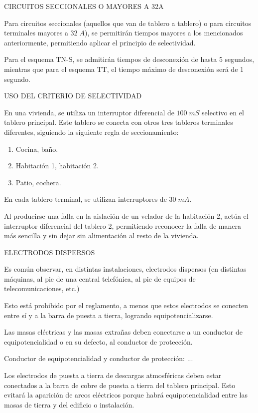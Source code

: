 CIRCUITOS SECCIONALES O MAYORES A 32A

Para circuitos seccionales (aquellos que van de tablero a tablero) o para circuitos terminales mayores a $32\; A$), se permitirán tiempos mayores a los mencionados anteriormente, permitiendo aplicar el principio de selectividad.

Para el esquema TN-S, se admitirán tiempos de desconexión de hasta 5 segundos, mientras que para el esquema TT, el tiempo máximo de desconexión será de 1 segundo.

USO DEL CRITERIO DE SELECTIVIDAD
\begin{ejemplo}
	En una vivienda, se utiliza un interruptor diferencial de $100\; mS$ selectivo en el tablero principal. Este tablero se conecta con otros tres tableros terminales diferentes, siguiendo la siguiente regla de seccionamiento:
	\begin{enumerate}
		\item Cocina, baño.
		\item Habitación 1, habitación 2.
		\item Patio, cochera.
	\end{enumerate}
 	En cada tablero terminal, se utilizan interruptores de $30\; mA$.
 	
 	Al producirse una falla en la aislación de un velador de la habitación 2, actúa el interruptor diferencial del tablero 2, permitiendo reconocer la falla de manera más sencilla y sin dejar sin alimentación al resto de la vivienda.
\end{ejemplo}


ELECTRODOS DISPERSOS

Es común observar, en distintas instalaciones, electrodos dispersos (en distintas máquinas, al pie de una central telefónica, al pie de equipos de telecomunicaciones, etc.)

Esto está prohibido por el reglamento, a menos que estos electrodos se conecten entre sí y a la barra de puesta a tierra, logrando equipotencializarse.

Las masas eléctricas y las masas extrañas deben conectarse a un conductor de equipotencialidad o en su defecto, al conductor de protección.

Conductor de equipotencialidad y conductor de protección: ...

Los electrodos de puesta a tierra de descargas atmosféricas deben estar conectados a la barra de cobre de puesta a tierra del tablero principal. Esto evitará la aparición de arcos eléctricos porque habrá equipotencialidad entre las masas de tierra y del edificio o instalación.

